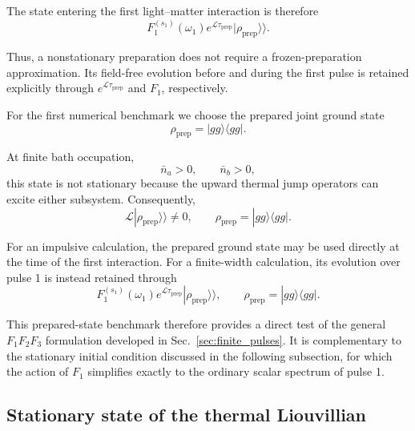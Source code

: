 \documentclass[11pt]{article}
\begin{document}
The state entering the first light--matter interaction is therefore
%
\begin{equation}
\boxed{
F_1^{(s_1)}(\omega_1)
e^{\mathcal{L}\tau_{\mathrm{prep}}}
|\rho_{\mathrm{prep}}\rangle\rangle .
}
\label{eq:F1_prepared_state}
\end{equation}

Thus, a nonstationary preparation does not require a
frozen-preparation approximation.  Its field-free evolution before
and during the first pulse is retained explicitly through
$e^{\mathcal{L}\tau_{\mathrm{prep}}}$ and $F_1$, respectively.

For the first numerical benchmark we choose the prepared joint ground
state
%
\begin{equation}
\boxed{
\rho_{\mathrm{prep}}
=
|gg\rangle\langle gg|.
}
\label{eq:ground_initial_state}
\end{equation}

At finite bath occupation,
%
\begin{equation}
\bar{n}_a>0,
\qquad
\bar{n}_b>0,
\end{equation}
%
this state is not stationary because the upward thermal jump operators
can excite either subsystem.  Consequently,
%
\begin{equation}
\boxed{
\mathcal{L}
|\rho_{\mathrm{prep}}\rangle\rangle
\neq0,
\qquad
\rho_{\mathrm{prep}}
=
|gg\rangle\langle gg|.
}
\label{eq:ground_nonstationary}
\end{equation}

For an impulsive calculation, the prepared ground state may be used
directly at the time of the first interaction.  For a finite-width
calculation, its evolution over pulse 1 is instead retained through
%
\begin{equation}
F_1^{(s_1)}(\omega_1)
e^{\mathcal{L}\tau_{\mathrm{prep}}}
|\rho_{\mathrm{prep}}\rangle\rangle,
\qquad
\rho_{\mathrm{prep}}
=
|gg\rangle\langle gg|.
\end{equation}

This prepared-state benchmark therefore provides a direct test of the
general $F_1F_2F_3$ formulation developed in
Sec.~\ref{sec:finite_pulses}.  It is complementary to the stationary
initial condition discussed in the following subsection, for which
the action of $F_1$ simplifies exactly to the ordinary scalar spectrum
of pulse 1.

\subsection{Stationary state of the thermal Liouvillian}
\label{subsec:dimer_stationary_state}
\end{document}
